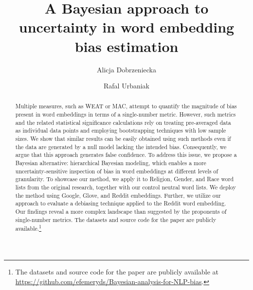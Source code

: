 \documentclass{clv3}
\begin{document}




\title{A Bayesian approach to uncertainty in word embedding bias
estimation}

\author{Alicja Dobrzeniecka}


\author{Rafal Urbaniak%
}



\maketitle

\begin{abstract}
Multiple measures, such as WEAT or MAC, attempt to
quantify the magnitude of bias present in word embeddings in terms of a
single-number metric. However, such metrics and the related statistical
significance calculations rely on treating pre-averaged data as
individual data points and employing bootstrapping techniques with low
sample sizes. We show that similar results can be easily obtained using
such methods even if the data are generated by a null model lacking the
intended bias. Consequently, we argue that this approach generates false
confidence. To address this issue, we propose a Bayesian alternative:
hierarchical Bayesian modeling, which enables a more
uncertainty-sensitive inspection of bias in word embeddings at different
levels of granularity. To showcase our method, we apply it to
Religion, Gender, and Race word lists from the original
research, together with our control neutral word lists. We deploy the
method using Google, Glove, and Reddit embeddings.
Further, we utilize our approach to evaluate a debiasing technique
applied to the Reddit word embedding. Our findings reveal a more
complex landscape than suggested by the proponents of single-number
metrics. The datasets and source code for the paper are publicly
available.\footnote{The datasets and source code for the paper are publicly
available at \url{https://github.com/efemeryds/Bayesian-analysis-for-NLP-bias}.}
\end{abstract}
\end{document}
